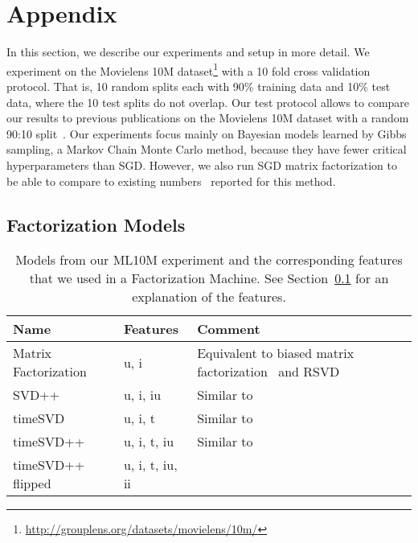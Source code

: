 \documentclass{article}
\begin{document}
\newpage\section*{Appendix}

In this section, we describe our experiments and setup in more detail.
We experiment on the Movielens 10M dataset\footnote{\url{http://grouplens.org/datasets/movielens/10m/}} with a 10 fold cross validation protocol. That is, 10 random splits each with 90\% training data and 10\% test data, where the 10 test splits do not overlap.
Our test protocol allows to compare our results to previous publications on the Movielens 10M dataset with a random 90:10 split~\cite{lee:icml13,sedhain:www15,li:icml16,strub:arxiv16,chen:ijcai16,zheng:icml16,chen:aaai17,li:nips17}.
Our experiments focus mainly on Bayesian models learned by Gibbs sampling, a Markov Chain Monte Carlo method, because they have fewer critical hyperparameters than SGD.
However, we also run SGD matrix factorization to be able to compare to existing numbers~\cite{sedhain:www15,li:icml16} reported for this method.

\subsection{Factorization Models}
\label{sec:fm_features}

\begin{table}[t]
\begin{center}
\begin{tabular}{llp{}}
\toprule
Name &  Features &  Comment \\
\midrule
Matrix Factorization & u, i &  Equivalent to biased matrix factorization~\cite{koren:ieee09} and RSVD~\cite{paterek:kddcup07} \\
SVD++ & u, i, iu  &  Similar to \cite{koren:kdd08} \\
timeSVD & u, i, t &  Similar to \cite{koren:kdd09} \\
timeSVD++ & u, i, t, iu & Similar to \cite{koren:kdd09} \\
timeSVD++ flipped & u, i, t, iu, ii  &\\
\bottomrule
\end{tabular}
\end{center}
   \caption{Models from our ML10M experiment and the corresponding features that we used in a Factorization Machine. See Section~\ref{sec:fm_features} for an explanation of the features.}
    \label{tbl:models}
\end{table}
\end{document}
